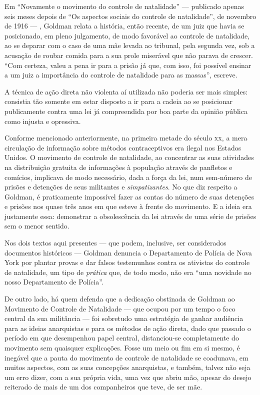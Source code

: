 Em
``Novamente o movimento do controle de natalidade'' --- publicado apenas
seis meses depois de ``Os aspectos sociais do controle de natalidade'', de
novembro de 1916 --- , Goldman relata a história, então recente, de um
juiz que havia se posicionado, em pleno julgamento, de modo favorável ao
controle de natalidade, ao se deparar com o caso de uma mãe levada ao
tribunal, pela segunda vez, sob a acusação de roubar comida para a sua
prole miserável que não parava de crescer. ``Com certeza, valeu a pena
ir para a prisão já que, com isso, foi possível ensinar a um juiz a
importância do controle de natalidade para as massas'', escreve.

A técnica de ação direta não violenta aí utilizada não
poderia ser mais simples: consistia tão somente em estar disposto a ir
para a cadeia ao se posicionar publicamente contra uma lei já
compreendida por boa parte da opinião pública como injusta e opressiva.

Conforme mencionado anteriormente, na primeira metade do século \textsc{xx}, a
mera circulação de informação sobre métodos contraceptivos era
ilegal nos Estados Unidos. O movimento de controle de
natalidade, ao concentrar as suas atividades na distribuição gratuita de
informações à população através de panfletos e comícios, implicava de
modo necessário, dada a força da lei, num sem-número de prisões e
detenções de seus militantes e \textit{simpatizantes}. No que diz
respeito a Goldman, é praticamente impossível fazer as contas do número
de suas detenções e prisões nos quase três anos em que esteve à frente
do movimento. E a ideia era justamente essa: demonstrar a obsolescência
da lei através de uma série de prisões sem o menor sentido.

Nos dois textos aqui presentes --- que podem, inclusive, ser considerados
documentos históricos --- Goldman denuncia o Departamento de Polícia de
Nova York por plantar provas e dar falsos testemunhos contra os
ativistas do controle de natalidade, um tipo de \textit{prática} que, de todo
modo, não era ``uma novidade no nosso Departamento de
Polícia''.

De outro lado, há quem defenda que a dedicação obstinada de
Goldman ao Movimento de Controle de Natalidade --- que ocupou por um tempo
o foco central da sua militância --- foi
sobretudo uma estratégia de ganhar audiência para as ideias anarquistas
e para os métodos de ação direta, dado que passado o período em que
desempenhou papel central, distanciou-se completamente do movimento sem
quaisquer explicações. Fosse um meio ou fim em si mesmo, é inegável que
a pauta do movimento de controle de natalidade se coadunava, em muitos
aspectos, com as suas concepções anarquistas, e também, talvez não seja
um erro dizer, com a sua própria vida, uma vez que abriu mão, apesar do
desejo reiterado de mais de um dos companheiros que teve, de ser mãe.


